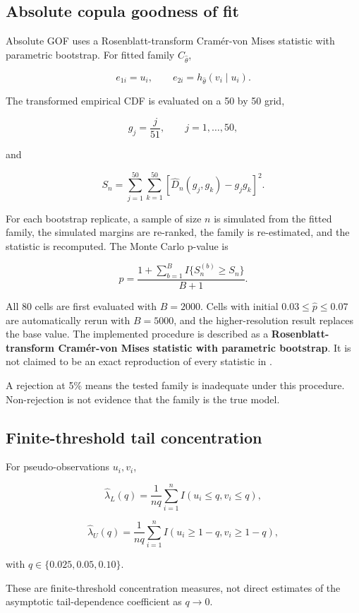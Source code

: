 \subsection{Absolute copula goodness of fit}

Absolute GOF uses a Rosenblatt-transform Cramér-von Mises statistic with parametric bootstrap. For fitted family \(C_{\hat\theta}\),

\[
e_{1i}=u_i,\qquad e_{2i}=h_{\hat\theta}(v_i\mid u_i).
\]

The transformed empirical CDF is evaluated on a 50 by 50 grid,

\[
g_j=\frac{j}{51},\qquad j=1,\ldots,50,
\]

and

\[
S_n=
\sum_{j=1}^{50}\sum_{k=1}^{50}
\left[\hat D_n(g_j,g_k)-g_jg_k\right]^2.
\]

For each bootstrap replicate, a sample of size \(n\) is simulated from the fitted family, the simulated margins are re-ranked, the family is re-estimated, and the statistic is recomputed. The Monte Carlo p-value is

\[
\hat p=\frac{1+\sum_{b=1}^{B}I\{S_n^{(b)}\ge S_n\}}{B+1}.
\]

All 80 cells are first evaluated with \(B=2000\). Cells with initial \(0.03\le\hat p\le0.07\) are automatically rerun with \(B=5000\), and the higher-resolution result replaces the base value. The implemented procedure is described as a \textbf{Rosenblatt-transform Cramér-von Mises statistic with parametric bootstrap}. It is not claimed to be an exact reproduction of every statistic in \citet{genest2009}.

A rejection at 5\% means the tested family is inadequate under this procedure. Non-rejection is not evidence that the family is the true model.

\subsection{Finite-threshold tail concentration}

For pseudo-observations \(u_i,v_i\),

\[
\hat\lambda_L(q)=\frac{1}{nq}\sum_{i=1}^{n}I(u_i\le q,v_i\le q),
\]

\[
\hat\lambda_U(q)=\frac{1}{nq}\sum_{i=1}^{n}I(u_i\ge1-q,v_i\ge1-q),
\]

with \(q\in\{0.025,0.05,0.10\}\).

These are finite-threshold concentration measures, not direct estimates of the asymptotic tail-dependence coefficient as \(q\to0\).

